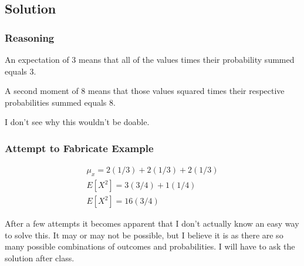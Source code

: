 \documentclass[12pt]{article}
\begin{document}
\subsection{Solution}
\subsubsection{Reasoning}
An expectation of 3 means that all of the values times their probability summed equals 3. 

A second moment of 8 means that those values squared times their respective probabilities summed equals 8.

I don't see why this wouldn't be doable.
\subsubsection{Attempt to Fabricate Example}
\begin{align*}
\mu_x=2(1/3)+2(1/3)+2(1/3)\\
E[X^2]=3(3/4)+1(1/4)\\
E[X^2]=16(3/4)
\end{align*}

After a few attempts it becomes apparent that I don't actually know an easy way to solve this. It may or may not be
possible, but I believe it is as there are so many possible combinations of outcomes and probabilities. I will
have to ask the solution after class.
\end{document}
